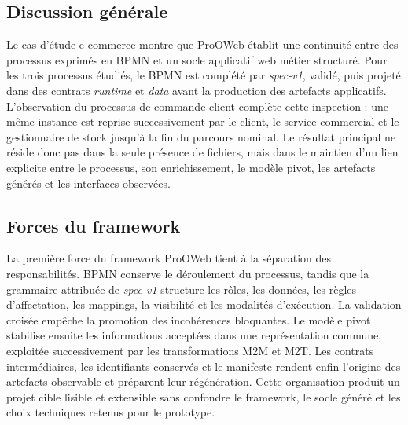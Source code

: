 

\subsection*{Discussion générale}
Le cas d'étude e-commerce montre que ProOWeb établit une continuité entre des
processus exprimés en BPMN et un socle applicatif web métier structuré. Pour les
trois processus étudiés, le BPMN est complété par \textit{spec-v1}, validé, puis
projeté dans des contrats \textit{runtime} et \textit{data} avant la production
des artefacts applicatifs. L'observation du processus de commande client complète
cette inspection : une même instance est reprise successivement par le client,
le service commercial et le gestionnaire de stock jusqu'à la fin du parcours
nominal. Le résultat principal ne réside donc pas dans la seule présence de
fichiers, mais dans le maintien d'un lien explicite entre le processus, son
enrichissement, le modèle pivot, les artefacts générés et les interfaces
observées.

\subsection*{Forces du framework}
La première force du framework ProOWeb tient à la séparation des responsabilités.
BPMN conserve le déroulement du processus, tandis que la grammaire attribuée de
\textit{spec-v1} structure les rôles, les données, les règles d'affectation, les
mappings, la visibilité et les modalités d'exécution. La validation croisée
empêche la promotion des incohérences bloquantes. Le modèle pivot stabilise
ensuite les informations acceptées dans une représentation commune, exploitée
successivement par les transformations M2M et M2T. Les contrats intermédiaires,
les identifiants conservés et le manifeste rendent enfin l'origine des artefacts
observable et préparent leur régénération. Cette organisation produit un projet
cible lisible et extensible sans confondre le framework, le socle généré et les
choix techniques retenus pour le prototype.

